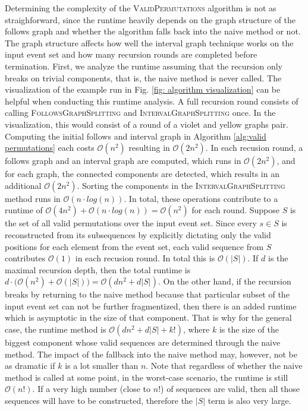 Determining the complexity of the \textsc{ValidPermutations} algorithm is not as straighforward, since the runtime heavily depends on the graph structure of the follows graph and whether the algorithm falls back into the naive method or not.
The graph structure affects how well the interval graph technique works on the input event set and how many recursion rounds are completed before termination.
First, we analyze the runtime assuming that the recursion only breaks on trivial components, that is, the naive method is never called.
The visualization of the example run in Fig. \ref{fig: algorithm visualization} can be helpful when conducting this runtime analysis.
A full recursion round consists of calling \textsc{FollowsGraphSplitting} and \textsc{IntervalGraphSplitting} once.
In the visualization, this would consist of a round of a violet and yellow graphs pair.
Computing the initial follows and interval graph in Algorithm \ref{alg:valid permutations} each costs $\mathcal{O}(n^2)$ resulting in $\mathcal{O}(2n^2)$.
In each recusion round, a follows graph and an interval graph are computed, which runs in $\mathcal{O}(2n^2)$, and for each graph, the connected components are detected, which results in an additional $\mathcal{O}(2n^2)$.
Sorting the components in the \textsc{IntervalGraphSplitting} method runs in $\mathcal{O}(n \cdot log(n))$.
In total, these operations contribute to a runtime of $\mathcal{O}(4n^2)+\mathcal{O}(n \cdot log(n)) = \mathcal{O}(n^2)$ for each round.
Suppose $S$ is the set of all valid permutations over the input event set.
Since every $s \in S$ is reconstructed from its subsequences by explicitly dictating only the valid positions for each element from the event set, each valid sequence from $S$ contributes $\mathcal{O}(1)$ in each recusion round.
In total this is $\mathcal{O}(|S|)$.
If $d$ is the maximal recursion depth, then the total runtime is $d \cdot \big(\mathcal{O}(n^2) + \mathcal{O}(|S|) \big) = \mathcal{O}(dn^2 + d|S|)$.
On the other hand, if the recursion breaks by returning to the naive method because that particular subset of the input event set can not be further fragmentized, then there is an added runtime which is asymptotic in the size of that component.
That is why for the general case, the runtime method is $\mathcal{O}(dn^2 + d|S| + k!)$, where $k$ is the size of the biggest component whose valid sequences are determined through the naive method.
The impact of the fallback into the naive method may, however, not be as dramatic if $k$ is a lot smaller than $n$.
Note that regardless of whether the naive method is called at some point, in the worst-case scenario, the runtime is still $\mathcal{O}(n!)$.
If a very high number (close to $n!$) of sequences are valid, then all those sequences will have to be constructed, therefore the $|S|$ term is also very large. 

